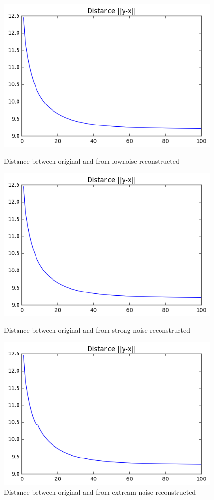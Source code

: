 \documentclass[a4paper,11pt]{article}
\begin{document}
\begin{figure}[htbp]
  \includegraphics[scale=0.7]{dlown.png}
  \caption{Distance between original and from lownoise reconstructed}
  \includegraphics[scale=0.7]{dh.png}
  \caption{Distance between original and from strong noise reconstructed}
  \includegraphics[scale=0.7]{de.png}
  \caption{Distance between original and from extream noise reconstructed}
\end{figure}
\end{document}
